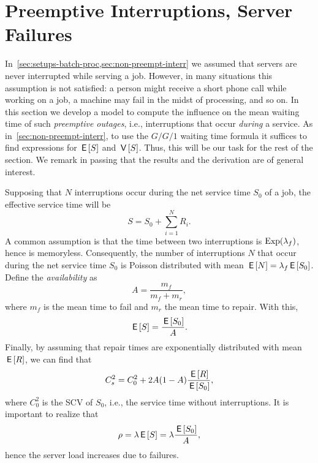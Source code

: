 \section{Preemptive Interruptions, Server Failures}
\label{sec:preempt-interr-serv}




In~\cref{sec:setups-batch-proc,sec:non-preempt-interr} we assumed that servers are never interrupted while serving a job.
However, in many situations this assumption is not satisfied: a person might receive a short phone call while working on a job, a machine may fail in the midst of processing, and so on.
In this section we develop a model to compute the influence on the mean waiting time of such \emph{preemptive outages}, i.e., interruptions that occur \emph{during} a service.
As in~\cref{sec:non-preempt-interr}, to use the $G/G/1$ waiting time formula it suffices to find expressions for $\,\mathsf{E}\left[S\right]$ and $\,\mathsf{V}\left[S\right]$.
Thus, this will be our task for the rest of the section.
We remark in passing that the results and the derivation are of general interest.

Supposing that $N$ interruptions occur during the net service time $S_0$ of a job, the effective service time will be
\begin{equation*}
S= S_0 + \sum_{i=1}^N R_i.
\end{equation*}
A common assumption is that the time between two interruptions is $\operatorname{Exp}(\lambda_f)$, hence is memoryless.
Consequently, the number of interruptions $N$ that occur during the net service time $S_0$ is  Poisson distributed with mean $\,\mathsf{E}\left[N\right] = \lambda_f \,\mathsf{E}\left[S_0\right]$.
Define the \emph{availability} as
\begin{equation*}
  A=\frac{m_f}{m_f + m_r},
\end{equation*}
where $m_f$ is the mean time to fail and $m_r$ the mean time to repair. 
With this,
\begin{equation}\label{eq:83}
  \,\mathsf{E}\left[S\right] = \frac{\,\mathsf{E}\left[S_0\right]}{A}. 
\end{equation}
Finally, by  assuming that repair times are exponentially distributed with mean $\,\mathsf{E}\left[R\right]$, we can find that 
\begin{equation}\label{eq:87}
    C_s^2 = C_0^2 + 2 A(1-A) \frac{\,\mathsf{E}\left[R\right]}{\,\mathsf{E}\left[S_0\right]},
\end{equation}
where $C_0^2$ is the SCV of $S_0$, i.e., the service time without interruptions. 
It is important to realize that 
\begin{equation*}
\rho = \lambda \,\mathsf{E}\left[S\right] = \lambda \frac{\,\mathsf{E}\left[S_0\right]}A,
\end{equation*}
hence the server load increases due to failures. 

